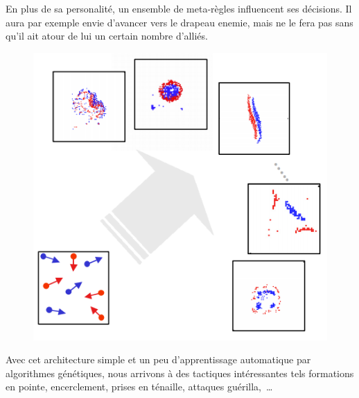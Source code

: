 \documentclass{article}
\begin{document}
En plus de sa personalité, un ensemble de \og{}meta-règles\fg{} influencent ses décisions. Il aura par exemple envie d'avancer vers le drapeau enemie, mais ne le fera pas sans qu'il ait atour de lui un certain nombre d'alliés.

\begin{figure}[H]
	\begin{center}
	\includegraphics[width=0.8\linewidth]{../ressources/einstein_global_behavior}
	\caption{}
	\end{center}
\end{figure}

Avec cet architecture simple et un peu d'apprentissage automatique par algorithmes génétiques, nous arrivons à des tactiques intéressantes tels formations en pointe, encerclement, prises en ténaille, attaques guérilla,~\dots
\end{document}
